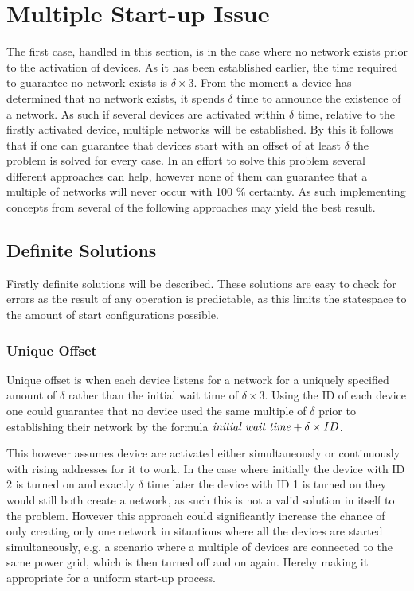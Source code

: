 \section{Multiple Start-up Issue}\label{sec:MSI-CCRC}
The first case, handled in this section, is in the case where no network exists prior to the activation of devices.
As it has been established earlier, the time required to guarantee no network exists is $\delta \times 3$.
From the moment a device has determined that no network exists, it spends $\delta$ time to announce the existence of a network.
As such if several devices are activated within $\delta$ time, relative to the firstly activated device, multiple networks will be established.
By this it follows that if one can guarantee that devices start with an offset of at least $\delta$ the problem is solved for every case.
In an effort to solve this problem several different approaches can help, however none of them can guarantee that a multiple of networks will never occur with 100 \% certainty. 
As such implementing concepts from several of the following approaches may yield the best result.

\subsection{Definite Solutions}
Firstly definite solutions will be described.
These solutions are easy to check for errors as the result of any operation is predictable, as this limits the statespace to the amount of start configurations possible.

\subsubsection{Unique Offset}
Unique offset is when each device listens for a network for a uniquely specified amount of $\delta$ rather than the initial wait time of $\delta \times 3$.
Using the ID of each device one could guarantee that no device used the same multiple of $\delta$ prior to establishing their network by the formula $\text{\textit{initial wait time}} + \delta \times ID$.

This however assumes device are activated either simultaneously or continuously with rising addresses for it to work.
In the case where initially the device with ID 2 is turned on and exactly $\delta$ time later the device with ID 1 is turned on they would still both create a network, as such this is not a valid solution in itself to the problem.
However this approach could significantly increase the chance of only creating only one network in situations where all the devices are started simultaneously, e.g. a scenario where a multiple of devices are connected to the same power grid, which is then turned off and on again.
Hereby making it appropriate for a uniform start-up process.


